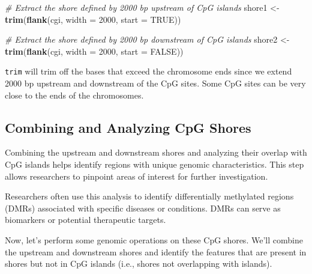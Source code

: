 \documentclass[
]{book}
\newenvironment{Shaded}{\begin{snugshade}}{\end{snugshade}}
\newcommand{\AttributeTok}[1]{\textcolor[rgb]{0.13,0.29,0.53}{#1}}
\newcommand{\CommentTok}[1]{\textcolor[rgb]{0.56,0.35,0.01}{\textit{#1}}}
\newcommand{\ConstantTok}[1]{\textcolor[rgb]{0.56,0.35,0.01}{#1}}
\newcommand{\DecValTok}[1]{\textcolor[rgb]{0.00,0.00,0.81}{#1}}
\newcommand{\FunctionTok}[1]{\textcolor[rgb]{0.13,0.29,0.53}{\textbf{#1}}}
\newcommand{\NormalTok}[1]{#1}
\newcommand{\OtherTok}[1]{\textcolor[rgb]{0.56,0.35,0.01}{#1}}
\begin{document}
\begin{Shaded}
\begin{Highlighting}[]
\CommentTok{\# Extract the shore defined by 2000 bp upstream of CpG islands}
\NormalTok{shore1 }\OtherTok{\textless{}{-}} \FunctionTok{trim}\NormalTok{(}\FunctionTok{flank}\NormalTok{(cgi, }\AttributeTok{width =} \DecValTok{2000}\NormalTok{, }\AttributeTok{start =} \ConstantTok{TRUE}\NormalTok{))}

\CommentTok{\# Extract the shore defined by 2000 bp downstream of CpG islands}
\NormalTok{shore2 }\OtherTok{\textless{}{-}} \FunctionTok{trim}\NormalTok{(}\FunctionTok{flank}\NormalTok{(cgi, }\AttributeTok{width =} \DecValTok{2000}\NormalTok{, }\AttributeTok{start =} \ConstantTok{FALSE}\NormalTok{))}
\end{Highlighting}
\end{Shaded}

\texttt{trim} will trim off the bases that exceed the chromosome ends since we extend 2000 bp
upstream and downstream of the CpG sites. Some CpG sites can be very close to the ends of the chromosomes.

\hypertarget{combining-and-analyzing-cpg-shores}{%
\subsection{Combining and Analyzing CpG Shores}\label{combining-and-analyzing-cpg-shores}}

Combining the upstream and downstream shores and analyzing their overlap with CpG islands helps identify regions with unique genomic characteristics. This step allows researchers to pinpoint areas of interest for further investigation.

Researchers often use this analysis to identify differentially methylated regions (DMRs) associated with specific diseases or conditions. DMRs can serve as biomarkers or potential therapeutic targets.

Now, let's perform some genomic operations on these CpG shores. We'll combine the upstream and downstream shores and identify the features that are present in shores but not in CpG islands (i.e., shores not overlapping with islands).
\end{document}
